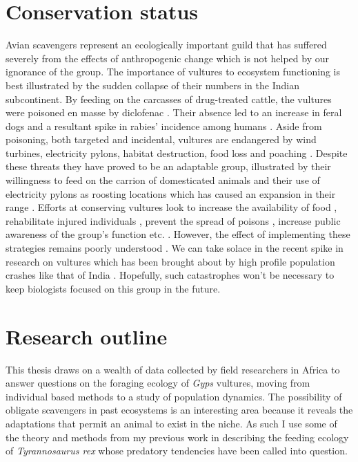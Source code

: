 \section{\uppercase{C}onservation status}
Avian scavengers represent an ecologically important guild that has suffered severely from the effects of anthropogenic change \citep{ogada2012dropping} which is not helped by our ignorance of the group. The importance of vultures to ecosystem functioning is best illustrated by the sudden collapse of their numbers in the Indian subcontinent. By feeding on the carcasses of drug-treated cattle, the vultures were poisoned en masse by diclofenac \citep{oaks2004diclofenac}. Their absence led to an increase in feral dogs and a resultant spike in rabies' incidence among humans \citep{markandya2008counting}. Aside from poisoning, both targeted and incidental, vultures are endangered by wind turbines, electricity pylons, habitat destruction, food loss and poaching \citep{monadjem2003threatened,virani2011major,martin2012visual}. Despite these threats they have proved to be an adaptable group, illustrated by their willingness to feed on the carrion of domesticated animals \citep{mundy1992vultures} and their use of electricity pylons as roosting locations which has caused an expansion in their range \citep{phipps2013power}. Efforts at conserving vultures look to increase the availability of food \citep{piper2005supplementary}, rehabilitate injured individuals \citep{monadjem2014effect}, prevent the spread of poisons \citep{green2004diclofenac}, increase public awareness of the group's function etc. \citep{monadjem2004vultures}. However, the effect of implementing these strategies remains poorly understood \citep{monadjem2014effect}. We can take solace in the recent spike in research on vultures which has been brought about by high profile population crashes like that of India \citep{manga2006vulture}. Hopefully, such catastrophes won't be necessary to keep biologists focused on this group in the future. 

\section{\uppercase{R}esearch outline}
This thesis draws on a wealth of data collected by field researchers in Africa to answer questions on the foraging ecology of \textit{Gyps} vultures, moving from individual based methods to a study of population dynamics. The possibility of obligate scavengers in past ecosystems is an interesting area because it reveals the adaptations that permit an animal to exist in the niche. As such I use some of the theory and methods from my previous work in describing the feeding ecology of \textit{Tyrannosaurus rex} whose predatory tendencies have been called into question. 
\vspace{10 mm}


